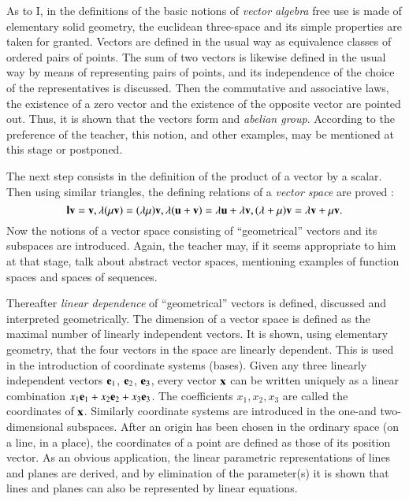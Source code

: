 As to I, in the definitions of the basic notions of \textit{vector
  algebra} free use is made of elementary solid geometry, the
euclidean three-space and its simple properties are taken for
granted. Vectors are defined in the usual way as equivalence classes
of ordered pairs of points. The sum of two vectors is likewise defined
in the usual way by means of representing pairs of points, and its
independence of the choice of the representatives is discussed. Then
the commutative and associative laws, the existence of a zero vector
and the existence of the opposite vector are pointed out. Thus, it is
shown that the vectors form and \textit{abelian group}. According to
the preference of the teacher, this notion, and other examples, may be
mentioned at this stage or postponed.

The next step consists in the definition of the product of a vector by
a scalar. Then using similar triangles, the defining relations of a
\textit{vector space} are proved :
$$
\mathbf{l} \mathbf{v} = \mathbf{v}, \lambda (\mu \mathbf{v}) =(\lambda \mu)\mathbf{v}, \lambda (\mathbf{u} +
\mathbf{v}) = \lambda \mathbf{u} + \lambda \mathbf{v}, (\lambda + \mu) \mathbf{v} = \lambda \mathbf{v} +
\mu \mathbf{v} .
$$\pageoriginale
Now the notions of a vector space consisting of ``geometrical''
vectors and its subspaces are introduced. Again, the teacher may, if
it seems appropriate to him at that stage, talk about abstract vector
spaces, mentioning examples of function spaces and spaces of
sequences.

Thereafter \textit{linear dependence} of ``geometrical'' vectors is
defined, discussed and interpreted geometrically. The dimension of a
vector space is defined as the maximal number of linearly independent
vectors. It is shown, using elementary geometry, that the four vectors
in the space are linearly dependent. This is used in the introduction
of coordinate systems (bases). Given any three linearly independent
vectors $\mathbf{e}_1$, $\mathbf{e}_2$, $\mathbf{e}_3$, every vector $\mathbf{x}$ can be written
uniquely as a linear combination $x_1 \mathbf{e}_1 + x_2 \mathbf{e}_2 + x_3
\mathbf{e}_3$. The coefficients $x_1, x_2, x_3$ are called the coordinates of
$\mathbf{x}$. Similarly coordinate systems are introduced in the one-and
two-dimensional subspaces. After an origin has been chosen in the
ordinary space (on a line, in a place), the coordinates of a point are
defined as those of its position vector. As an obvious application,
the linear parametric representations of lines and planes are derived,
and by elimination of the parameter(s) it is shown that lines and
planes can also be represented by linear equations.

